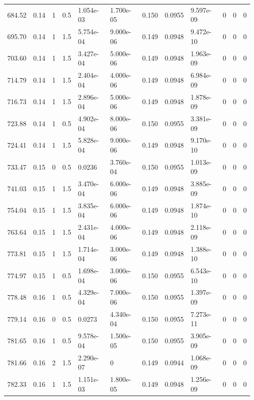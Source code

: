 \documentclass[preview]{standalone}
\begin{document}
{{{\begin{tabular}{L{1.2cm}C{1.2cm} C{0.3cm}C{0.5cm} C{1.4cm}C{1.4cm} C{1.4cm}C{1.4cm} C{1.6cm}C{1.6cm} C{1.6cm}C{1.6cm}}
  684.52  &  0.14  & 1     & 0.5 &  1.054e-03  & 1.700e-05  &  0.150&   0.0955& 9.597e-09 & 0   &  0 & 0  \\ 
  695.70  &  0.14  & 1     & 1.5 &  5.754e-04  & 9.000e-06  &  0.149&   0.0948& 9.472e-10 & 0   &  0 & 0  \\ 
  703.60  &  0.14  & 1     & 1.5 &  3.427e-04  & 5.000e-06  &  0.149&   0.0948& 1.963e-09 & 0   &  0 & 0  \\ 
  714.79  &  0.14  & 1     & 1.5 &  2.404e-04  & 4.000e-06  &  0.149&   0.0948& 6.984e-09 & 0   &  0 & 0  \\ 
  716.73  &  0.14  & 1     & 1.5 &  2.896e-04  & 5.000e-06  &  0.149&   0.0948& 1.878e-09 & 0   &  0 & 0  \\ 
  723.88  &  0.14  & 1     & 0.5 &  4.902e-04  & 8.000e-06  &  0.150&   0.0955& 3.381e-09 & 0   &  0 & 0  \\ 
  724.41  &  0.14  & 1     & 1.5 &  5.828e-04  & 9.000e-06  &  0.149&   0.0948& 9.170e-10 & 0   &  0 & 0  \\ 
  733.47  &  0.15  & 0     & 0.5 &  0.0236  & 3.760e-04  &  0.150&   0.0955& 1.013e-09 & 0   &  0 & 0  \\ 
  741.03  &  0.15  & 1     & 1.5 &  3.470e-04  & 6.000e-06  &  0.149&   0.0948& 3.885e-09 & 0   &  0 & 0  \\ 
  754.04  &  0.15  & 1     & 1.5 &  3.835e-04  & 6.000e-06  &  0.149&   0.0948& 1.874e-10 & 0   &  0 & 0  \\ 
  763.64  &  0.15  & 1     & 1.5 &  2.431e-04  & 4.000e-06  &  0.149&   0.0948& 2.118e-09 & 0   &  0 & 0  \\ 
  773.81  &  0.15  & 1     & 1.5 &  1.714e-04  & 3.000e-06  &  0.149&   0.0948& 1.388e-10 & 0   &  0 & 0  \\ 
  774.97  &  0.15  & 1     & 0.5 &  1.698e-04  & 3.000e-06  &  0.150&   0.0955& 6.543e-10 & 0   &  0 & 0  \\ 
  778.48  &  0.16  & 1     & 0.5 &  4.329e-04  & 7.000e-06  &  0.150&   0.0955& 1.397e-09 & 0   &  0 & 0  \\ 
  779.14  &  0.16  & 0     & 0.5 &  0.0273  & 4.340e-04  &  0.150&   0.0955& 7.273e-11 & 0   &  0 & 0  \\ 
  781.65  &  0.16  & 1     & 0.5 &  9.578e-04  & 1.500e-05  &  0.150&   0.0955& 3.905e-09 & 0   &  0 & 0  \\ 
  781.66  &  0.16  & 2     & 1.5 &  2.290e-07  & 0  &  0.149&   0.0944& 1.068e-09 & 0   &  0 & 0  \\ 
  782.33  &  0.16  & 1     & 1.5 &  1.151e-03  & 1.800e-05  &  0.149&   0.0948& 1.256e-09 & 0   &  0 & 0  \\ 

\end{tabular}}}}
\end{document}
